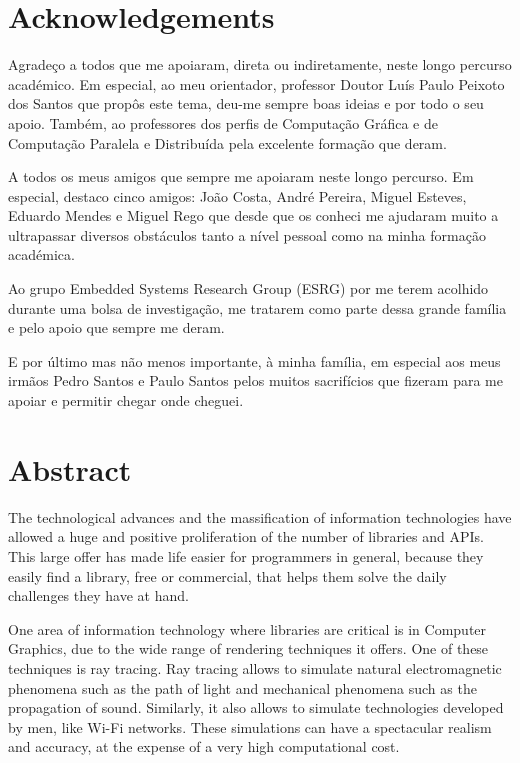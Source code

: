\documentclass[
  oneside,
  11pt, a4paper,
  footinclude=true,
  headinclude=true,
  cleardoublepage=empty,
  bibliography=totocnumbered
]{scrbook}
\author{Tiago Manuel da Silva Santos}
\date{\myear} %
\begin{document}
\umfrontcover
\umtitlepage
	
\chapter*{Acknowledgements}

\par
Agradeço a todos que me apoiaram, direta ou indiretamente, neste longo percurso académico.
Em especial, ao meu orientador, professor Doutor Luís Paulo Peixoto dos Santos que propôs
este tema, deu-me sempre boas ideias e por todo o seu apoio.
Também, ao professores dos perfis de Computação Gráfica e de Computação Paralela e Distribuída pela excelente formação que deram.

\par
A todos os meus amigos que sempre me apoiaram neste longo percurso.
Em especial, destaco cinco amigos: João Costa, André Pereira, Miguel Esteves, Eduardo Mendes e Miguel Rego que desde que os conheci me ajudaram muito a ultrapassar diversos obstáculos tanto a nível pessoal como na minha formação académica.

\par
Ao grupo Embedded Systems Research Group (ESRG) por me terem acolhido durante uma bolsa de investigação, me tratarem como parte dessa grande família e pelo apoio que sempre me deram.

\par
E por último mas não menos importante, à minha família, em especial aos meus irmãos Pedro Santos e Paulo Santos pelos muitos sacrifícios que fizeram para me apoiar e permitir chegar onde cheguei.

\chapter*{Abstract}

\par
The technological advances and the massification of information technologies have allowed a huge and positive proliferation of the number of libraries and APIs.
This large offer has made life easier for programmers in general, because they easily find a library, free or commercial, that helps them solve the daily challenges they have at hand.

\par
One area of information technology where libraries are critical is in Computer Graphics, due to the wide range of rendering techniques it offers.
One of these techniques is ray tracing.
Ray tracing allows to simulate natural electromagnetic phenomena such as the path of light and mechanical phenomena such as the propagation of sound.
Similarly, it also allows to simulate technologies developed by men, like Wi-Fi networks.
These simulations can have a spectacular realism and accuracy, at the expense of a very high computational cost.
\end{document}
